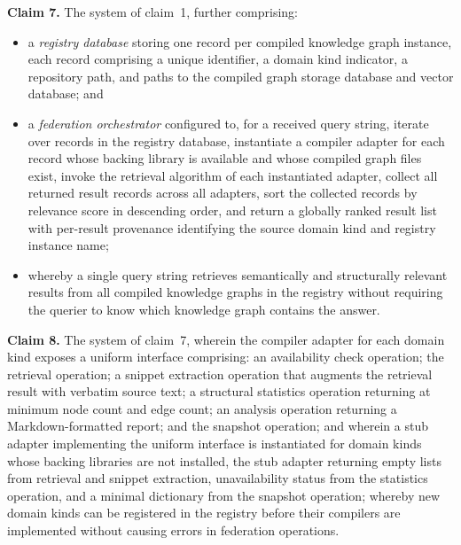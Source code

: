 \documentclass[12pt]{article}
\begin{document}
\bigskip
\noindent\textbf{Claim 7.}\quad
The system of claim~1, further comprising:
\begin{itemize}[leftmargin=2.5em]
  \item a \emph{registry database} storing one record per compiled knowledge
    graph instance, each record comprising a unique identifier, a domain kind
    indicator, a repository path, and paths to the compiled graph storage
    database and vector database; and
  \item a \emph{federation orchestrator} configured to, for a received query
    string, iterate over records in the registry database, instantiate a compiler
    adapter for each record whose backing library is available and whose compiled
    graph files exist, invoke the retrieval algorithm of each instantiated
    adapter, collect all returned result records across all adapters, sort the
    collected records by relevance score in descending order, and return a
    globally ranked result list with per-result provenance identifying the source
    domain kind and registry instance name;
  \item whereby a single query string retrieves semantically and structurally
    relevant results from all compiled knowledge graphs in the registry without
    requiring the querier to know which knowledge graph contains the answer.
\end{itemize}

\bigskip
\noindent\textbf{Claim 8.}\quad
The system of claim~7, wherein the compiler adapter for each domain kind exposes
a uniform interface comprising: an availability check operation; the retrieval
operation; a snippet extraction operation that augments the retrieval result with
verbatim source text; a structural statistics operation returning at minimum node
count and edge count; an analysis operation returning a Markdown-formatted report;
and the snapshot operation; and wherein a stub adapter implementing the uniform
interface is instantiated for domain kinds whose backing libraries are not
installed, the stub adapter returning empty lists from retrieval and snippet
extraction, unavailability status from the statistics operation, and a minimal
dictionary from the snapshot operation; whereby new domain kinds can be registered
in the registry before their compilers are implemented without causing errors in
federation operations.
\end{document}
